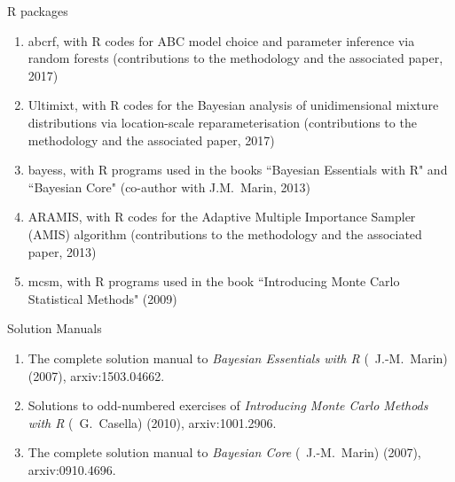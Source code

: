 \bigskip
		\centerline{\sc R packages}

\medskip
\begin{enumerate}
\renewcommand{\theenumi}{[S-\arabic{enumi}]}
\item {\sf abcrf}, with R codes for ABC model choice and parameter inference via random forests (contributions to the methodology and the associated paper, 2017)
\item {\sf Ultimixt}, with R codes for the Bayesian analysis of unidimensional mixture distributions via location-scale reparameterisation (contributions to the methodology and the associated paper, 2017)
\item {\sf bayess}, with R programs used in the books ``Bayesian Essentials with R" and ``Bayesian Core" (co-author with J.M.~Marin, 2013)
\item {\sf ARAMIS}, with R codes for the Adaptive Multiple Importance Sampler (AMIS) algorithm (contributions to the methodology and the associated paper, 2013)
\item {\sf mcsm}, with R programs used in the book ``Introducing Monte Carlo Statistical Methods" (2009)
\end{enumerate}

\bigskip
		\centerline{\sc Solution Manuals}

\medskip
\begin{enumerate}
\renewcommand{\theenumi}{[S-\arabic{enumi}]}
\item The complete solution manual to {\em Bayesian Essentials with R}
(\avec\ J.-M.~Marin) (2007), {\sf arxiv:1503.04662}.

\item Solutions to odd-numbered exercises of {\em Introducing Monte 
Carlo Methods with R} (\avec\ G.~Casella) (2010), {\sf arxiv:1001.2906}.

\item The complete solution manual to {\em Bayesian Core}
(\avec\ J.-M.~Marin) (2007), {\sf arxiv:0910.4696}.
\end{enumerate}
%
